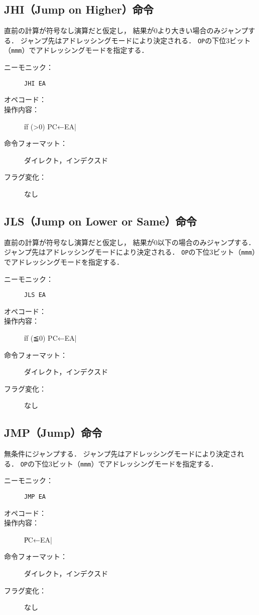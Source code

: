 \subsection{JHI（Jump on Higher）命令}
直前の計算が符号なし演算だと仮定し，
結果が0より大きい場合のみジャンプする．
ジャンプ先はアドレッシングモードにより決定される．
\texttt{OP}の下位3ビット（\texttt{mmm}）でアドレッシングモードを指定する．

\begin{description}
\item[ニーモニック：] \texttt{JHI EA}
\item[オペコード：] 
\item[操作内容：] \|if (>0) PC←EA|
\item[命令フォーマット：] ダイレクト，インデクスド
\item[フラグ変化：] なし
\end{description}

\subsection{JLS（Jump on Lower or Same）命令}
直前の計算が符号なし演算だと仮定し，
結果が0以下の場合のみジャンプする．
ジャンプ先はアドレッシングモードにより決定される．
\texttt{OP}の下位3ビット（\texttt{mmm}）でアドレッシングモードを指定する．

\begin{description}
\item[ニーモニック：] \texttt{JLS EA}
\item[オペコード：] 
\item[操作内容：] \|if (≦0) PC←EA|
\item[命令フォーマット：] ダイレクト，インデクスド
\item[フラグ変化：] なし
\end{description}

\subsection{JMP（Jump）命令}
無条件にジャンプする．
ジャンプ先はアドレッシングモードにより決定される．
\texttt{OP}の下位3ビット（\texttt{mmm}）でアドレッシングモードを指定する．

\begin{description}
\item[ニーモニック：] \texttt{JMP EA}
\item[オペコード：] 
\item[操作内容：] \|PC←EA|
\item[命令フォーマット：] ダイレクト，インデクスド
\item[フラグ変化：] なし
\end{description}

